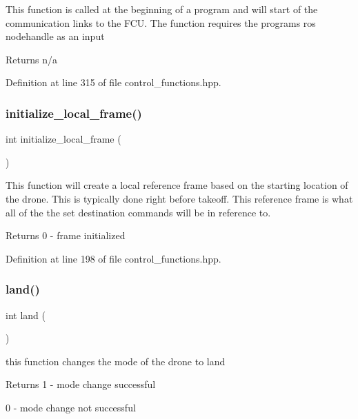 This function is called at the beginning of a program and will start of the communication links to the F\+CU. The function requires the program\textquotesingle{}s ros nodehandle as an input \begin{DoxyReturn}{Returns}
n/a 
\end{DoxyReturn}


Definition at line 315 of file control\+\_\+functions.\+hpp.

\mbox{\label{group__control__functions_ga2a1100bb15673a9322c5be3bb8e9999f}} 
\subsubsection{\texorpdfstring{initialize\_local\_frame()}{initialize\_local\_frame()}}
{\footnotesize\ttfamily int initialize\+\_\+local\+\_\+frame (\begin{DoxyParamCaption}{ }\end{DoxyParamCaption})}

This function will create a local reference frame based on the starting location of the drone. This is typically done right before takeoff. This reference frame is what all of the the set destination commands will be in reference to. \begin{DoxyReturn}{Returns}
0 -\/ frame initialized 
\end{DoxyReturn}


Definition at line 198 of file control\+\_\+functions.\+hpp.

\mbox{\label{group__control__functions_ga52a11a139e56315de52d2ab439b0d203}} 
\subsubsection{\texorpdfstring{land()}{land()}}
{\footnotesize\ttfamily int land (\begin{DoxyParamCaption}{ }\end{DoxyParamCaption})}

this function changes the mode of the drone to land \begin{DoxyReturn}{Returns}
1 -\/ mode change successful 

0 -\/ mode change not successful 
\end{DoxyReturn}



